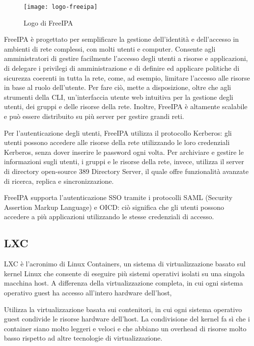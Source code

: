 \begin{figure}[!h] 
    \centering 
    \texttt{[image: logo-freeipa]} 
    \caption{Logo di FreeIPA}
    \label{fig:logo-freeipa}
\end{figure}


FreeIPA è progettato per semplificare la gestione dell'identità e dell'accesso in ambienti di rete complessi, con molti utenti e computer. Consente agli amministratori di gestire facilmente l'accesso degli utenti a risorse e applicazioni, di delegare i privilegi di amministrazione e di definire ed applicare politiche di sicurezza coerenti in tutta la rete, come, ad esempio, limitare l'accesso alle risorse in base al ruolo dell'utente. Per fare ciò, mette a disposizione, oltre che agli strumenti della CLI, un'interfaccia utente web intuitiva per la gestione degli utenti, dei gruppi e delle risorse della rete. Inoltre, FreeIPA è altamente scalabile e può essere distribuito su più server per gestire grandi reti.

Per l'autenticazione degli utenti, FreeIPA utilizza il protocollo Kerberos: gli utenti possono accedere alle risorse della rete utilizzando le loro credenziali Kerberos, senza dover inserire le password ogni volta.
Per archiviare e gestire le informazioni sugli utenti, i gruppi e le risorse della rete, invece, utilizza il server di directory open-source 389 Directory Server, il quale offre funzionalità avanzate di ricerca, replica e sincronizzazione.

FreeIPA supporta l'autenticazione SSO tramite i protocolli SAML (Security Assertion Markup Language) e OICD: ciò significa che gli utenti possono accedere a più applicazioni utilizzando le stesse credenziali di accesso.

\subsection{LXC}
LXC è l'acronimo di Linux Containers, un sistema di virtualizzazione basato sul kernel Linux che consente di eseguire più sistemi operativi isolati su una singola macchina host. A differenza della virtualizzazione completa, in cui ogni sistema operativo guest ha accesso all'intero hardware dell'host, 

Utilizza la virtualizzazione basata sui contenitori, in cui ogni sistema operativo guest condivide le risorse hardware dell'host.
La condivisione del kernel fa sì che i container siano molto leggeri e veloci e che abbiano un overhead di risorse molto basso rispetto ad altre tecnologie di virtualizzazione.


